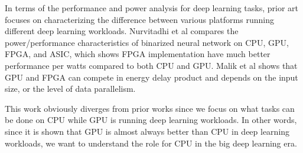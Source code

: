In terms of the performance and power analysis for deep learning tasks, prior art focuses on characterizing the difference between various platforms running different deep learning workloads. Nurvitadhi et al \cite{nurvitadhi2016accelerating} compares the power/performance characteristics of binarized neural network on CPU, GPU, FPGA, and ASIC, which shows FPGA implementation have much better performance per watts compared to both CPU and GPU. Malik et al \cite{malik2016architecture} shows that GPU and FPGA can compete in energy delay product and depends on the input size, or the level of data parallelism.

This work obviously diverges from prior works since we focus on what tasks can be done on CPU while GPU is running deep learning workloads. In other words, since it is shown that GPU is almost always better than CPU in deep learning workloads, we want to understand the role for CPU in the big deep learning era.